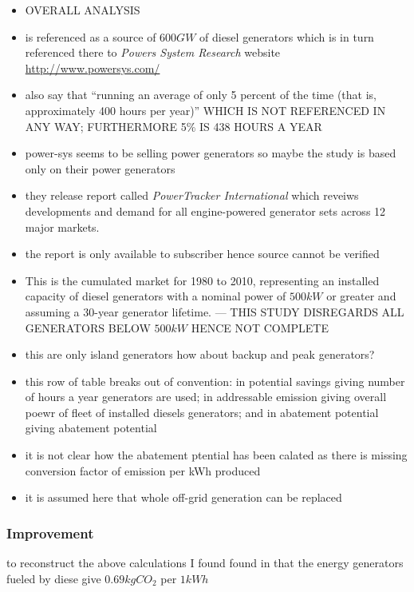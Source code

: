 \documentclass[11pt, twocolumn]{article}
\begin{document}
\begin{itemize}
\item OVERALL ANALYSIS
\item \citep{pieper2011revisiting} is referenced as a source of $600GW$ of diesel generators which is in turn referenced there to \emph{Powers System Research} website \url{http://www.powersys.com/}
\item also \citep{pieper2011revisiting} say that ``running an average of only 5 percent of the time (that is, approximately 400 hours per year)'' WHICH IS NOT REFERENCED IN ANY WAY; FURTHERMORE 5\% IS 438 HOURS A YEAR
\item power-sys seems to be selling power generators so maybe the study is based only on their power generators
\item they release report called \emph{PowerTracker International} which reveiws developments and demand for all engine-powered generator sets across 12 major markets.
\item the report is only available to subscriber hence source cannot be verified
\item  This is the cumulated market for 1980 to 2010, representing an installed capacity of diesel generators with a nominal power of $500 kW$ or greater and assuming a 30-year generator lifetime. --- THIS STUDY DISREGARDS ALL GENERATORS BELOW $500 kW$ HENCE NOT COMPLETE
\item this are only island generators how about backup and peak generators?
\item this row of table breaks out of convention: in potential savings giving number of hours a year generators are used; in addressable emission giving overall poewr of fleet of installed diesels generators; and in abatement potential giving abatement potential
\item it is not clear how the abatement ptential has been calated as there is missing conversion factor of emission per kWh produced 

\item it is assumed here that whole off-grid generation can be replaced

\end{itemize}
\subsubsection{Improvement}
to reconstruct the above calculations I found found in \citep{iea2012co2} that the energy generators fueled by diese give $0.69 kgCO_2$ per $1kWh$\\
\end{document}
